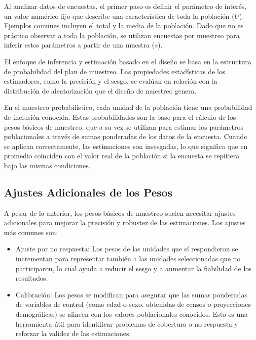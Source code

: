 \documentclass[
  spanish,
  12pt,
]{book}
\providecommand{\tightlist}{%
  \setlength{\itemsep}{0pt}\setlength{\parskip}{0pt}}
\begin{document}
Al analizar datos de encuestas, el primer paso es definir el parámetro de interés, un valor numérico fijo que describe una característica de toda la población (\(U\)). Ejemplos comunes incluyen el total y la media de la población. Dado que no es práctico observar a toda la población, se utilizan encuestas por muestreo para inferir estos parámetros a partir de una muestra (\(s\)).

El enfoque de inferencia y estimación basado en el diseño se basa en la estructura de probabilidad del plan de muestreo. Las propiedades estadísticas de los estimadores, como la precisión y el sesgo, se evalúan en relación con la distribución de aleatorización que el diseño de muestreo genera.

En el muestreo probabilístico, cada unidad de la población tiene una probabilidad de inclusión conocida. Estas probabilidades son la base para el cálculo de los pesos básicos de muestreo, que a su vez se utilizan para estimar los parámetros poblacionales a través de sumas ponderadas de los datos de la encuesta. Cuando se aplican correctamente, las estimaciones son insesgadas, lo que significa que en promedio coinciden con el valor real de la población si la encuesta se repitiera bajo las mismas condiciones.

\subsection{Ajustes Adicionales de los Pesos}\label{ajustes-adicionales-de-los-pesos}

A pesar de lo anterior, los pesos básicos de muestreo suelen necesitar ajustes adicionales para mejorar la precisión y robustez de las estimaciones. Los ajustes más comunes son:

\begin{itemize}
\tightlist
\item
  Ajuste por no respuesta: Los pesos de las unidades que sí respondieron se incrementan para representar también a las unidades seleccionadas que no participaron, lo cual ayuda a reducir el sesgo y a aumentar la fiabilidad de los resultados.
\item
  Calibración: Los pesos se modifican para asegurar que las sumas ponderadas de variables de control (como edad o sexo, obtenidas de censos o proyecciones demográficas) se alineen con los valores poblacionales conocidos. Esto es una herramienta útil para identificar problemas de cobertura o no respuesta y reforzar la validez de las estimaciones.
\end{itemize}
\end{document}
